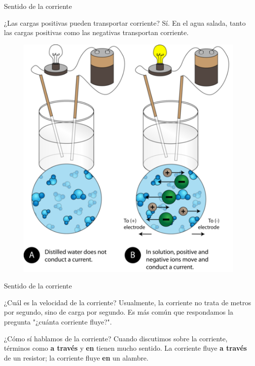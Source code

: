 \documentclass[10pt]{beamer}
\begin{document}
\begin{frame}{Sentido de la corriente}{}
\begin{block}{¿Las cargas positivas pueden transportar corriente?}
 Sí. En el agua salada, tanto las cargas positivas como las negativas transportan corriente. 
\end{block}

\begin{figure}[h!]
\centering
\includegraphics [scale=1.3]{saltwater}
\label{fig:first}
\end{figure}
\end{frame}

\begin{frame}{Sentido de la corriente}{}
\begin{block}{¿Cuál es la velocidad de la corriente?}
Usualmente, la corriente no trata de metros por segundo, sino de carga por segundo. Es más común que respondamos la pregunta "¿cuánta corriente fluye?".
\end{block}

\begin{block}{¿Cómo sí hablamos de la corriente?}
Cuando discutimos sobre la corriente, términos como \textbf{a través} y \textbf{en} tienen mucho sentido. La corriente fluye \textbf{a través} de un resistor; la corriente fluye \textbf{en} un alambre.
\end{block}

\end{frame}
\end{document}
